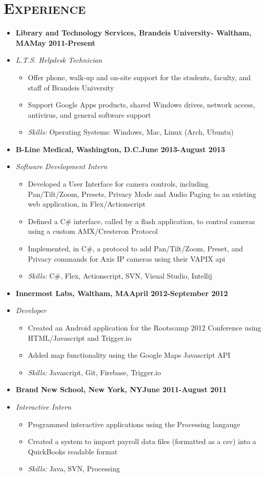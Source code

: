 \documentclass[10pt, oneside]{article}
\newcommand{\lr}[2]{#1\hfill#2}
\newcommand{\skills}[1]{
\item[] \textsl{Skills:} #1
}
\newenvironment{ressection}[1]{
  \section{\normalsize \scshape \selectfont #1 \normalfont}
  \vspace{-4pt}
  \begin{itemize} \itemsep-2pt
  }{
  \end{itemize}
  \vspace{-20pt}
}
\newenvironment{resitem}[4]{
\item[] \lr{\bfseries \selectfont #1\normalfont, #2} {#3}
\item[] \textsl{#4}
  \vspace{-4pt}
  \begin{itemize} \itemsep-2pt
  }{
  \end{itemize}
}
\begin{document}
\begin{ressection}{Experience}
  \begin{resitem}{Library and Technology Services}{Brandeis University- Waltham, MA}{May 2011-Present}{L.T.S. Helpdesk Technician} 
  \item Offer phone, walk-up and on-site support for the students, faculty, and staff of Brandeis University
  \item Support Google Apps products, shared Windows drives, network access, antivirus, and general software support 
    \skills{Operating Systems: Windows, Mac, Linux (Arch, Ubuntu)}
  \end{resitem}
  
  \begin{resitem}{B-Line Medical}{Washington, D.C.}{June 2013-August 2013}{Software Development Intern}
  \item Developed a User Interface for camera controls, including Pan/Tilt/Zoom, Presets, Privacy Mode and Audio Paging to an existing web application, in Flex/Actionscript
  \item Defined a C\# interface, called by a flash application, to control cameras using a custom AMX/Cresteron Protocol
  \item Implemented, in C\#, a protocol to add Pan/Tilt/Zoom, Preset, and Privacy commands for Axis IP cameras using their VAPIX api
    \skills{C\#, Flex, Actionscript, SVN, Visual Studio, Intellij}
  \end{resitem}
  \begin{resitem}{Innermost Labs}{Waltham, MA}{April 2012-September 2012}{Developer}
  \item Created an Android application for the Rootscamp 2012 Conference using HTML/Javascript and Trigger.io
  \item Added map functionality using the Google Maps Javascript API
    \skills{Javascript, Git, Firebase, Trigger.io}
  \end{resitem}
  \begin{resitem}{Brand New School}{New York, NY}{June 2011-August 2011}{Interactive Intern}
  \item Programmed interactive applications using the Processing langauge
  \item Created a system to import payroll data files (formatted as a csv) into a QuickBooks readable format
    \skills{Java, SVN, Processing}
  \end{resitem}
\end{ressection}
\end{document}
